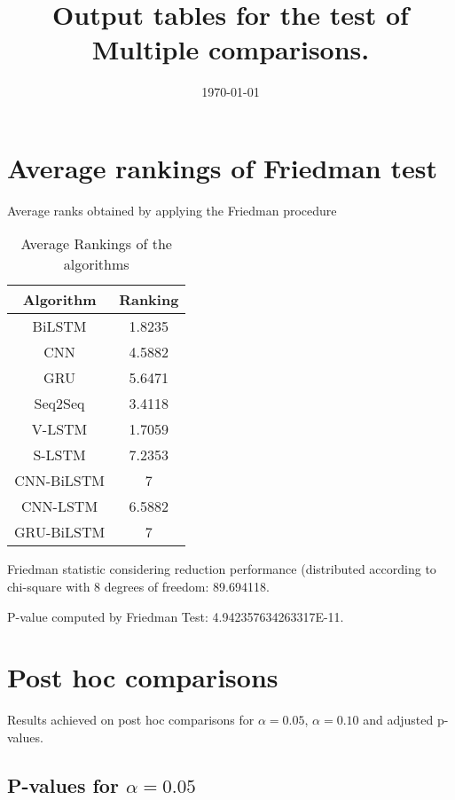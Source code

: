 \documentclass[a4paper,10pt]{article}
\title{Output tables for the test of Multiple comparisons.}
\author{}
\date{\today}
\begin{document}
\begin{landscape}
\pagestyle{empty}
\maketitle
\thispagestyle{empty}
\section{Average rankings of Friedman test}



Average ranks obtained by applying the Friedman procedure

\begin{table}[!htp]
\centering
\begin{tabular}{|c|c|}\hline
Algorithm&Ranking\\\hline
BiLSTM & 1.8235\\
CNN & 4.5882\\
GRU & 5.6471\\
Seq2Seq & 3.4118\\
V-LSTM & 1.7059\\
S-LSTM & 7.2353\\
CNN-BiLSTM & 7\\
CNN-LSTM & 6.5882\\
GRU-BiLSTM & 7\\
\hline
\end{tabular}
\caption{Average Rankings of the algorithms}
\end{table}

Friedman statistic considering reduction performance (distributed according to chi-square with 8 degrees of freedom: 89.694118.

P-value computed by Friedman Test: 4.942357634263317E-11.\newline



\pagebreak

\section{Post hoc comparisons}

Results achieved on post hoc comparisons for $\alpha = 0.05$, $\alpha = 0.10$ and adjusted p-values.

\subsection{P-values for $\alpha=0.05$}


\end{landscape}
\end{document}
